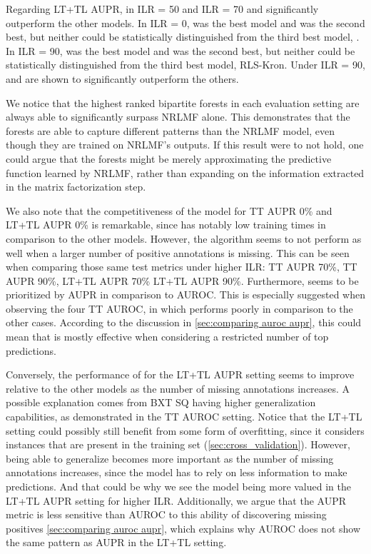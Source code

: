 Regarding LT+TL AUPR, in ILR = 50 and ILR = 70  and  significantly outperform the other models. In ILR = 0,  was the best model and  was the second best, but neither could be statistically distinguished from the third best model, . In ILR = 90,  was the best model and  was the second best, but neither could be statistically distinguished from the third best model, RLS-Kron. Under ILR = 90,  and  are shown to significantly outperform the others.

We notice that the highest ranked bipartite forests in each evaluation setting are always able to significantly surpass NRLMF alone. This demonstrates that the forests are able to capture different patterns than the NRLMF model, even though they are trained on NRLMF's outputs. If this result were to not hold, one could argue that the forests might be merely approximating the predictive function learned by NRLMF, rather than expanding on the information extracted in the matrix factorization step.

We also note that the competitiveness of the  model for TT AUPR 0\% and LT+TL AUPR 0\% is remarkable, since  has notably low training times in comparison to the other models.  %
However, the algorithm seems to not perform as well when a larger number of positive annotations is missing. This can be seen when comparing those same test metrics under higher ILR: TT AUPR 70\%, TT AUPR 90\%, LT+TL AUPR 70\% LT+TL AUPR 90\%.
Furthermore,  seems to be prioritized by AUPR in comparison to AUROC. This is especially suggested when observing the four TT AUROC, in which  performs poorly in comparison to the other cases.
According to the discussion in \autoref{sec:comparing auroc aupr}, this could mean that  is mostly effective when considering a restricted number of top predictions.

Conversely, the performance of  for the LT+TL AUPR setting seems to improve relative to the other models as the number of missing annotations increases. A possible explanation comes from BXT SQ having higher generalization capabilities, as demonstrated in the TT AUROC setting. Notice that the LT+TL setting could possibly still benefit from some form of overfitting, since it considers instances that are present in the training set (\autoref{sec:cross_validation}). However, being able to generalize becomes more important as the number of missing annotations increases, since the model has to rely on less information to make predictions. And that could be why we see the  model being more valued in the LT+TL AUPR setting for higher ILR.
Additionally, we argue that the AUPR metric is less sensitive than AUROC to this ability of discovering missing positives \autoref{sec:comparing auroc aupr}, which explains why AUROC does not show the same pattern as AUPR in the LT+TL setting.


